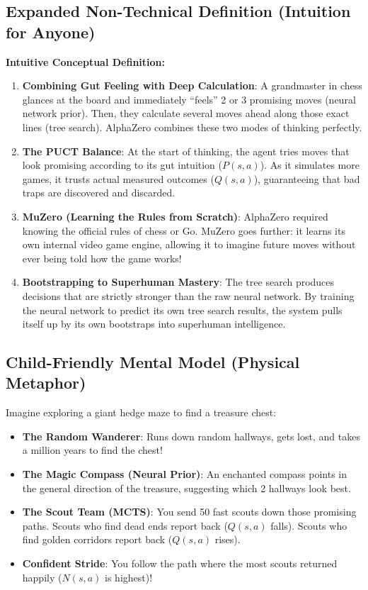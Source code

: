 \documentclass[11pt,a4paper]{article}
\theoremstyle{definition}
\begin{document}
\subsection{Expanded Non-Technical Definition (Intuition for Anyone)}
\textbf{Intuitive Conceptual Definition:}
\begin{enumerate}
    \item \textbf{Combining Gut Feeling with Deep Calculation}: A grandmaster in chess glances at the board and immediately ``feels'' 2 or 3 promising moves (neural network prior). Then, they calculate several moves ahead along those exact lines (tree search). AlphaZero combines these two modes of thinking perfectly.
    \item \textbf{The PUCT Balance}: At the start of thinking, the agent tries moves that look promising according to its gut intuition ($P(s, a)$). As it simulates more games, it trusts actual measured outcomes ($Q(s, a)$), guaranteeing that bad traps are discovered and discarded.
    \item \textbf{MuZero (Learning the Rules from Scratch)}: AlphaZero required knowing the official rules of chess or Go. MuZero goes further: it learns its own internal video game engine, allowing it to imagine future moves without ever being told how the game works!
    \item \textbf{Bootstrapping to Superhuman Mastery}: The tree search produces decisions that are strictly stronger than the raw neural network. By training the neural network to predict its own tree search results, the system pulls itself up by its own bootstraps into superhuman intelligence.
\end{enumerate}

\subsection{Child-Friendly Mental Model (Physical Metaphor)}
Imagine exploring a giant hedge maze to find a treasure chest:
\begin{itemize}
    \item \textbf{The Random Wanderer}: Runs down random hallways, gets lost, and takes a million years to find the chest!
    \item \textbf{The Magic Compass (Neural Prior)}: An enchanted compass points in the general direction of the treasure, suggesting which 2 hallways look best.
    \item \textbf{The Scout Team (MCTS)}: You send 50 fast scouts down those promising paths. Scouts who find dead ends report back ($Q(s, a)$ falls). Scouts who find golden corridors report back ($Q(s, a)$ rises).
    \item \textbf{Confident Stride}: You follow the path where the most scouts returned happily ($N(s, a)$ is highest)!
\end{itemize}
\end{document}
